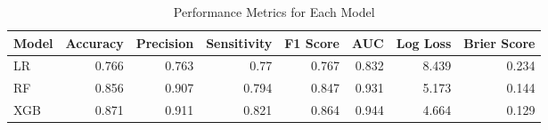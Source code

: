 \begin{table}[H]\centering
\caption{Performance Metrics for Each Model}
\label{Table 3 :performance_metrics}
\begin{tabular}{lrrrrrrr}
\toprule
Model & Accuracy & Precision & Sensitivity & F1 Score & AUC & Log Loss & Brier Score \\
\midrule
LR & 0.766 & 0.763 & 0.77 & 0.767 & 0.832 & 8.439 & 0.234 \\
RF & 0.856 & 0.907 & 0.794 & 0.847 & 0.931 & 5.173 & 0.144 \\
XGB & 0.871 & 0.911 & 0.821 & 0.864 & 0.944 & 4.664 & 0.129 \\
\bottomrule
\end{tabular}
\end{table}
